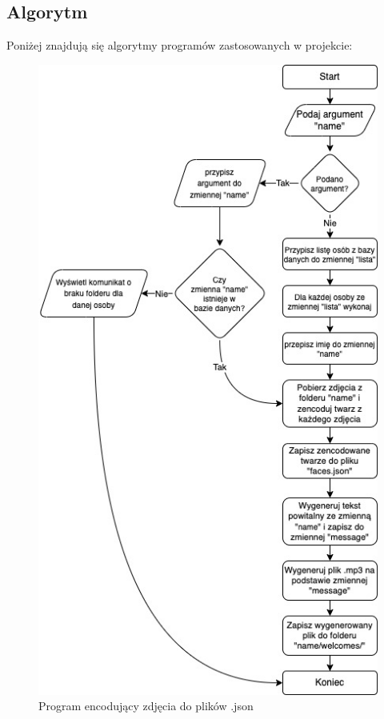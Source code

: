 \documentclass[a4paper,12pt,reqno]{article}
\begin{document}
\newpage
\subsection{Algorytm}
Poniżej znajdują się algorytmy programów zastosowanych w projekcie:

\begin{figure}[H]%
\centering
\includegraphics[width=0.7\columnwidth]{imgs/generujacy.drawio.jpg}
\caption{Program encodujący zdjęcia do plików .json \label{algorytm_encode_faces}}
\quad
\end{figure}
\end{document}
